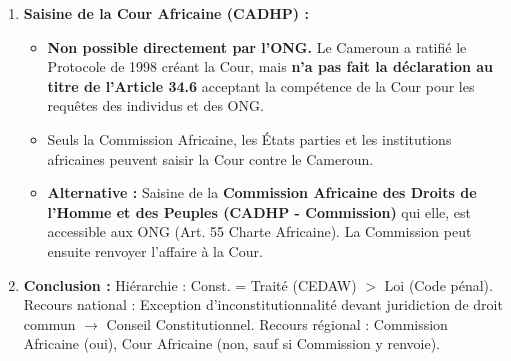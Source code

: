 \documentclass[11pt]{article}
\begin{document}
\begin{exoresolu}
\begin{enumerate}
\begin{itemize}
                \item \textbf{Voie la plus adaptée pour l'ONG :} Action en justice devant le TPI/Cour d'Appel $\rightarrow$ Exception d'inconstitutionnalité $\rightarrow$ Renvoi au Conseil Constitutionnel.
            \end{itemize}
        \item \textbf{Saisine de la Cour Africaine (CADHP) :}
            \begin{itemize}
                \item \textbf{Non possible directement par l'ONG.} Le Cameroun a ratifié le Protocole de 1998 créant la Cour, mais \textbf{n'a pas fait la déclaration au titre de l'Article 34.6} acceptant la compétence de la Cour pour les requêtes des individus et des ONG.
                \item Seuls la Commission Africaine, les États parties et les institutions africaines peuvent saisir la Cour contre le Cameroun.
                \item \textbf{Alternative :} Saisine de la \textbf{Commission Africaine des Droits de l'Homme et des Peuples (CADHP - Commission)} qui elle, est accessible aux ONG (Art. 55 Charte Africaine). La Commission peut ensuite renvoyer l'affaire à la Cour.
            \end{itemize}
        \item \textbf{Conclusion :} Hiérarchie : Const. = Traité (CEDAW) $>$ Loi (Code pénal). Recours national : Exception d'inconstitutionnalité devant juridiction de droit commun $\rightarrow$ Conseil Constitutionnel. Recours régional : Commission Africaine (oui), Cour Africaine (non, sauf si Commission y renvoie).
    \end{enumerate}
\end{exoresolu}
\end{document}
